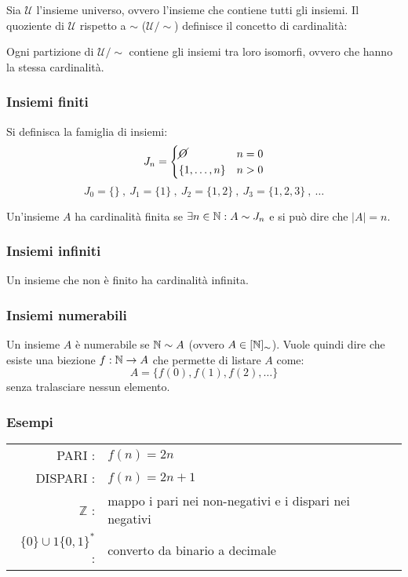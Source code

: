 Sia $\mathcal{U}$ l'insieme universo, ovvero l'insieme che contiene tutti gli insiemi.
Il quoziente di $\mathcal{U}$ rispetto a $\sim$ ($\mathcal{U}/\sim$) definisce il 
concetto di cardinalità:

\begin{figure}[H]
    \centering
    
\end{figure}

Ogni partizione di $\mathcal{U}/\sim$ contiene gli insiemi tra loro isomorfi, ovvero
che hanno la stessa cardinalità.

\subsubsection*{Insiemi finiti}
Si definisca la famiglia di insiemi: 
$$J_n=\begin{cases}
\cancel{O} & n=0\\
\{1,\dots ,n\} & n>0
\end{cases}$$
$$ J_0=\{\}\ , \ J_1=\{1\} \ , \ J_{2}=\{1,2\} \ , \ J_{3}=\{1,2,3\}\ , \ \dots $$

Un'insieme $A$ ha cardinalità finita se $\exists n\in\mathbb{N} : A\sim J_n$ e si può dire che
$|A|=n$.

\subsubsection*{Insiemi infiniti}
Un insieme che non è finito ha cardinalità infinita.

\subsubsection{Insiemi numerabili}
Un insieme $A$ è numerabile se $\mathbb{N}\sim A$ (ovvero $A\in [\mathbb{N}]_\sim$). Vuole quindi dire
che esiste una biezione $f:\mathbb{N}\rightarrow A$ che permette di listare $A$ come:
$$ A = \{f(0),f(1),f(2),\dots\} $$
senza tralasciare nessun elemento.
\subsubsection*{Esempi}
\begin{tabular}{r l}
    PARI :& $f(n)=2n$ \\
    DISPARI :& $f(n)=2n+1$ \\
    $\mathbb{Z}$ :& mappo i pari nei non-negativi e i dispari nei negativi \\
    $\{0\}\cup 1\{0,1\}^*$ :& converto da binario a decimale \\
\end{tabular}

